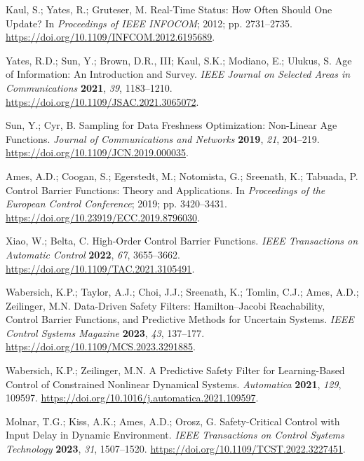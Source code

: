 
 Kaul, S.; Yates, R.; Gruteser, M. Real-Time Status: How Often Should One Update? In \emph{Proceedings of IEEE INFOCOM}; 2012; pp. 2731--2735. \url{https://doi.org/10.1109/INFCOM.2012.6195689}.

 Yates, R.D.; Sun, Y.; Brown, D.R., III; Kaul, S.K.; Modiano, E.; Ulukus, S. Age of Information: An Introduction and Survey. \emph{IEEE Journal on Selected Areas in Communications} \textbf{2021}, \emph{39}, 1183--1210. \url{https://doi.org/10.1109/JSAC.2021.3065072}.

 Sun, Y.; Cyr, B. Sampling for Data Freshness Optimization: Non-Linear Age Functions. \emph{Journal of Communications and Networks} \textbf{2019}, \emph{21}, 204--219. \url{https://doi.org/10.1109/JCN.2019.000035}.

 Ames, A.D.; Coogan, S.; Egerstedt, M.; Notomista, G.; Sreenath, K.; Tabuada, P. Control Barrier Functions: Theory and Applications. In \emph{Proceedings of the European Control Conference}; 2019; pp. 3420--3431. \url{https://doi.org/10.23919/ECC.2019.8796030}.

 Xiao, W.; Belta, C. High-Order Control Barrier Functions. \emph{IEEE Transactions on Automatic Control} \textbf{2022}, \emph{67}, 3655--3662. \url{https://doi.org/10.1109/TAC.2021.3105491}.

 Wabersich, K.P.; Taylor, A.J.; Choi, J.J.; Sreenath, K.; Tomlin, C.J.; Ames, A.D.; Zeilinger, M.N. Data-Driven Safety Filters: Hamilton--Jacobi Reachability, Control Barrier Functions, and Predictive Methods for Uncertain Systems. \emph{IEEE Control Systems Magazine} \textbf{2023}, \emph{43}, 137--177. \url{https://doi.org/10.1109/MCS.2023.3291885}.

 Wabersich, K.P.; Zeilinger, M.N. A Predictive Safety Filter for Learning-Based Control of Constrained Nonlinear Dynamical Systems. \emph{Automatica} \textbf{2021}, \emph{129}, 109597. \url{https://doi.org/10.1016/j.automatica.2021.109597}.

 Molnar, T.G.; Kiss, A.K.; Ames, A.D.; Orosz, G. Safety-Critical Control with Input Delay in Dynamic Environment. \emph{IEEE Transactions on Control Systems Technology} \textbf{2023}, \emph{31}, 1507--1520. \url{https://doi.org/10.1109/TCST.2022.3227451}.

